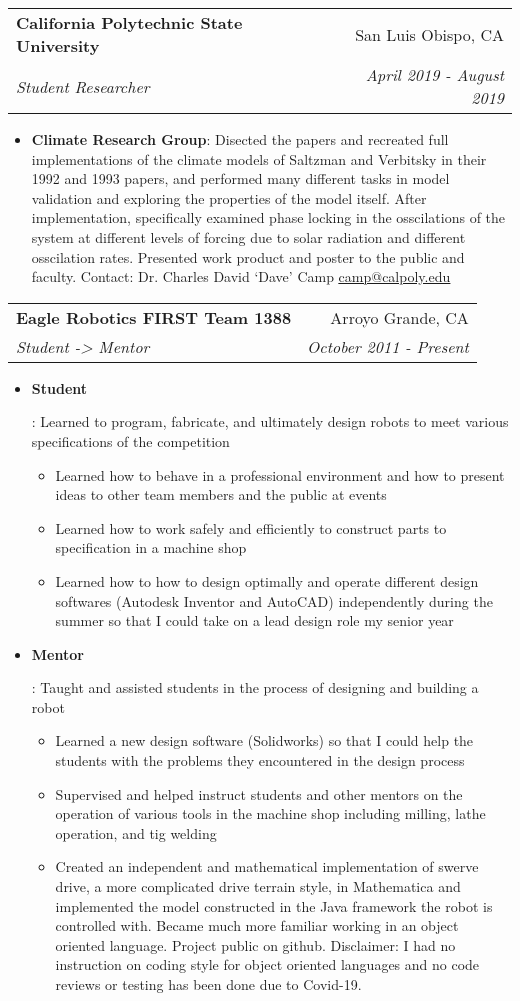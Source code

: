 \documentclass[letterpaper,10pt]{article}
\makeatletter
\newcommand{\resumeItem}[2]{
  \item\small{
    \textbf{#1}{: #2 \vspace{-2pt}}
  }
}
\newcommand{\resumeSubheading}[4]{
  \vspace{-1pt}\item[]
  \begin{tabular*}{0.98\textwidth}{l@{\extracolsep{\fill}}r}
      \hspace{-10pt}\textbf{#1} & #2 \\
      \hspace{-10pt}\textit{\small#3} & \textit{\small #4} \\
    \end{tabular*}\vspace{-5pt}
}
\newcommand{\resumeItemListStart}{\begin{itemize}}
\newcommand{\resumeItemListEnd}{\end{itemize}\vspace{-5pt}}
\makeatother
\begin{document}
    \resumeSubheading
      {California Polytechnic State University}{San Luis Obispo, CA}
      {Student Researcher}{April 2019 - August 2019}
      \resumeItemListStart
       \resumeItem{Climate Research Group}
          {Disected the papers and recreated full implementations of the climate models of Saltzman and Verbitsky in their 1992 and 1993 papers, and performed many different tasks in model validation and exploring the properties of the model itself. After implementation, specifically examined phase locking in the osscilations of the system at different levels of forcing due to solar radiation and different osscilation rates. Presented work product and poster to the public and faculty. Contact: Dr. Charles David `Dave' Camp \href{mailto:camp@calpoly.edu}{\color{blue}\underline{camp@calpoly.edu}}}
      \resumeItemListEnd

    \resumeSubheading
      {Eagle Robotics FIRST Team 1388}{Arroyo Grande, CA}
      {Student -> Mentor}{October 2011 - Present}
      \resumeItemListStart
        \resumeItem{Student}
          {Learned to program, fabricate, and ultimately design robots to meet various specifications of the competition
          \begin{itemize}
              \item Learned how to behave in a professional environment and how to present ideas to other team members and the public at events
              \item Learned how to work safely and efficiently to construct parts to specification in a machine shop
              \item Learned how to how to design optimally and operate different design softwares (Autodesk Inventor and AutoCAD) independently during the summer so that I could take on a lead design role my senior year
          \end{itemize}
          }
          \resumeItem{Mentor}
          {Taught and assisted students in the process of designing and building a robot
          \begin{itemize}
              \item Learned a new design software (Solidworks) so that I could help the students with the problems they encountered in the design process
              \item Supervised and helped instruct students and other mentors on the operation of various tools in the machine shop including milling, lathe operation, and tig welding
              \item Created an independent and mathematical implementation of swerve drive, a more complicated drive terrain style, in Mathematica and implemented the model constructed in the Java framework the robot is controlled with. Became much more familiar working in an object oriented language. Project public on github. Disclaimer: I had no instruction on coding style for object oriented languages and no code reviews or testing has been done due to Covid-19.
          \end{itemize}
          }
      \resumeItemListEnd
\end{document}
